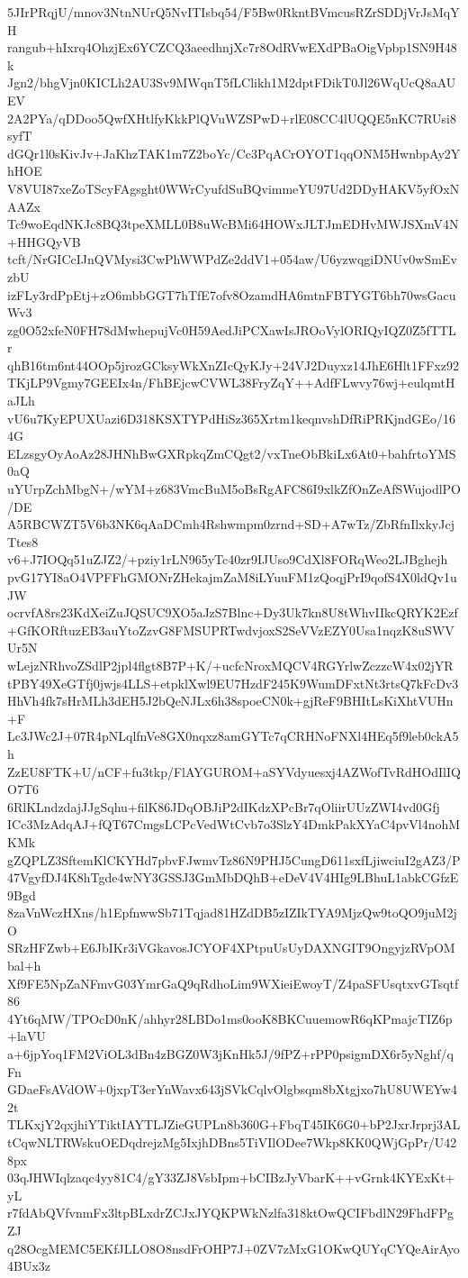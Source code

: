 5JIrPRqjU/mnov3NtnNUrQ5NvITIsbq54/F5Bw0RkntBVmcusRZrSDDjVrJsMqYH
rangub+hIxrq4OhzjEx6YCZCQ3aeedhnjXc7r8OdRVwEXdPBaOigVpbp1SN9H48k
Jgn2/bhgVjn0KICLh2AU3Sv9MWqnT5fLClikh1M2dptFDikT0Jl26WqUcQ8aAUEV
2A2PYa/qDDoo5QwfXHtlfyKkkPlQVuWZSPwD+rlE08CC4lUQQE5nKC7RUsi8syfT
dGQr1l0sKivJv+JaKhzTAK1m7Z2boYc/Cc3PqACrOYOT1qqONM5HwnbpAy2YhHOE
V8VUI87xeZoTScyFAgsght0WWrCyufdSuBQvimmeYU97Ud2DDyHAKV5yfOxNAAZx
Tc9woEqdNKJc8BQ3tpeXMLL0B8uWcBMi64HOWxJLTJmEDHvMWJSXmV4N+HHGQyVB
tcft/NrGICcIJnQVMysi3CwPhWWPdZe2ddV1+054aw/U6yzwqgiDNUv0wSmEvzbU
izFLy3rdPpEtj+zO6mbbGGT7hTfE7ofv8OzamdHA6mtnFBTYGT6bh70wsGacuWv3
zg0O52xfeN0FH78dMwhepujVc0H59AedJiPCXawIsJROoVylORIQyIQZ0Z5fTTLr
qhB16tm6nt44OOp5jrozGCksyWkXnZIcQyKJy+24VJ2Duyxz14JhE6Hlt1FFxz92
TKjLP9Vgmy7GEEIx4n/FhBEjcwCVWL38FryZqY++AdfFLwvy76wj+eulqmtHaJLh
vU6u7KyEPUXUazi6D318KSXTYPdHiSz365Xrtm1keqnvshDfRiPRKjndGEo/164G
ELzsgyOyAoAz28JHNhBwGXRpkqZmCQgt2/vxTneObBkiLx6At0+bahfrtoYMS0aQ
uYUrpZchMbgN+/wYM+z683VmcBuM5oBsRgAFC86I9xlkZfOnZeAfSWujodlPO/DE
A5RBCWZT5V6b3NK6qAaDCmh4Rshwmpm0zrnd+SD+A7wTz/ZbRfnIlxkyJcjTtes8
v6+J7IOQq51uZJZ2/+pziy1rLN965yTc40zr9IJUso9CdXl8FORqWeo2LJBghejh
pvG17YI8aO4VPFFhGMONrZHekajmZaM8iLYuuFM1zQoqjPrI9qofS4X0ldQv1uJW
ocrvfA8rs23KdXeiZuJQSUC9XO5aJzS7Blnc+Dy3Uk7kn8U8tWhvIIkcQRYK2Ezf
+GfKORftuzEB3auYtoZzvG8FMSUPRTwdvjoxS2SeVVzEZY0Usa1nqzK8uSWVUr5N
wLejzNRhvoZSdlP2jpl4flgt8B7P+K/+ucfcNroxMQCV4RGYrlwZczzcW4x02jYR
tPBY49XeGTfj0jwjs4LLS+etpklXwl9EU7HzdF245K9WumDFxtNt3rtsQ7kFcDv3
HhVh4fk7sHrMLh3dEH5J2bQeNJLx6h38spoeCN0k+gjReF9BHItLsKiXhtVUHn+F
Lc3JWc2J+07R4pNLqlfnVe8GX0nqxz8amGYTc7qCRHNoFNXl4HEq5f9leb0ckA5h
ZzEU8FTK+U/nCF+fu3tkp/FlAYGUROM+aSYVdyuesxj4AZWofTvRdHOdIlIQO7T6
6RlKLndzdajJJgSqhu+filK86JDqOBJiP2dIKdzXPcBr7qOliirUUzZWI4vd0Gfj
ICc3MzAdqAJ+fQT67CmgsLCPcVedWtCvb7o3SlzY4DmkPakXYaC4pvVl4nohMKMk
gZQPLZ3SftemKlCKYHd7pbvFJwmvTz86N9PHJ5CungD611sxfLjiwciuI2gAZ3/P
47VgyfDJ4K8hTgde4wNY3GSSJ3GmMbDQhB+eDeV4V4HIg9LBhuL1abkCGfzE9Bgd
8zaVnWczHXns/h1EpfnwwSb71Tqjad81HZdDB5zIZIkTYA9MjzQw9toQO9juM2jO
SRzHFZwb+E6JbIKr3iVGkavosJCYOF4XPtpuUsUyDAXNGIT9OngyjzRVpOMbal+h
Xf9FE5NpZaNFmvG03YmrGaQ9qRdhoLim9WXieiEwoyT/Z4paSFUsqtxvGTsqtf86
4Yt6qMW/TPOcD0nK/ahhyr28LBDo1ms0ooK8BKCuuemowR6qKPmajcTIZ6p+laVU
a+6jpYoq1FM2ViOL3dBn4zBGZ0W3jKnHk5J/9fPZ+rPP0psigmDX6r5yNghf/qFn
GDaeFsAVdOW+0jxpT3erYnWavx643jSVkCqlvOlgbsqm8bXtgjxo7hU8UWEYw42t
TLKxjY2qxjhiYTiktIAYTLJZieGUPLn8b360G+FbqT45IK6G0+bP2JxrJrprj3AL
tCqwNLTRWskuOEDqdrejzMg5IxjhDBns5TiVIlODee7Wkp8KK0QWjGpPr/U428px
03qJHWIqlzaqc4yy81C4/gY33ZJ8VsbIpm+bCIBzJyVbarK++vGrnk4KYExKt+yL
r7fdAbQVfvnmFx3ltpBLxdrZCJxJYQKPWkNzlfa318ktOwQCIFbdlN29FhdFPgZJ
q28OcgMEMC5EKfJLLO8O8nsdFrOHP7J+0ZV7zMxG1OKwQUYqCYQeAirAyo4BUx3z
